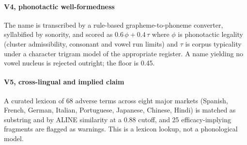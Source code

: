 \documentclass[conference]{IEEEtran}
\begin{document}
\paragraph{V4, phonotactic well-formedness}
The name is transcribed by a rule-based grapheme-to-phoneme converter,
syllabified by sonority, and scored as $0.6\,\phi + 0.4\,\tau$ where $\phi$ is
phonotactic legality (cluster admissibility, consonant and vowel run limits) and
$\tau$ is corpus typicality under a character trigram model of the appropriate
register. A name yielding no vowel nucleus is rejected outright; the floor is
0.45.

\paragraph{V5, cross-lingual and implied claim}
A curated lexicon of 68 adverse terms across eight major markets (Spanish,
French, German, Italian, Portuguese, Japanese, Chinese, Hindi) is matched as
substring and by ALINE similarity at a 0.88 cutoff, and 25 efficacy-implying
fragments are flagged as warnings. This is a lexicon lookup, not a phonological
model.
\end{document}
